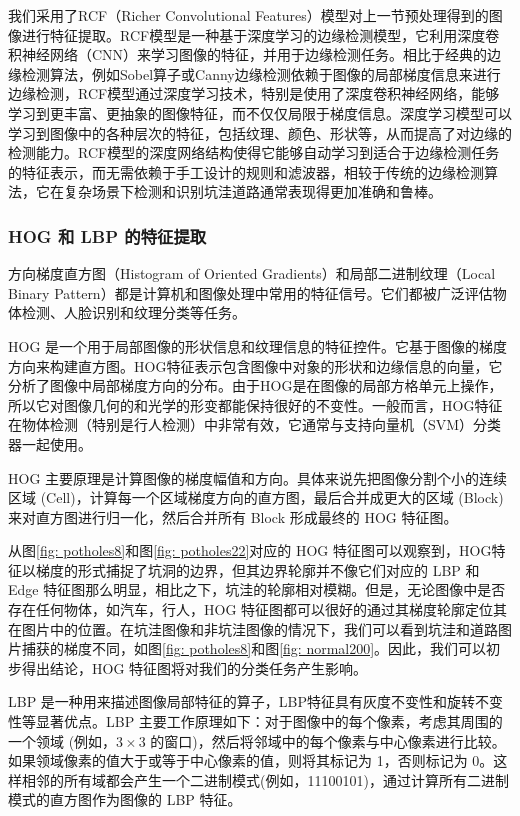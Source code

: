 \documentclass[a4paper, 10pt]{article}
\begin{document}
	我们采用了RCF（Richer Convolutional Features）模型对上一节预处理得到的图像进行特征提取。RCF模型是一种基于深度学习的边缘检测模型，它利用深度卷积神经网络（CNN）来学习图像的特征，并用于边缘检测任务。相比于经典的边缘检测算法，例如Sobel算子或Canny边缘检测依赖于图像的局部梯度信息来进行边缘检测，RCF模型通过深度学习技术，特别是使用了深度卷积神经网络，能够学习到更丰富、更抽象的图像特征，而不仅仅局限于梯度信息。深度学习模型可以学习到图像中的各种层次的特征，包括纹理、颜色、形状等，从而提高了对边缘的检测能力。RCF模型的深度网络结构使得它能够自动学习到适合于边缘检测任务的特征表示，而无需依赖于手工设计的规则和滤波器，相较于传统的边缘检测算法，它在复杂场景下检测和识别坑洼道路通常表现得更加准确和鲁棒。
	
	\subsubsection{HOG 和 LBP 的特征提取}
	
	方向梯度直方图（Histogram of Oriented Gradients）和局部二进制纹理（Local Binary Pattern）都是计算机和图像处理中常用的特征信号。它们都被广泛评估物体检测、人脸识别和纹理分类等任务。
	
	HOG 是一个用于局部图像的形状信息和纹理信息的特征控件。它基于图像的梯度方向来构建直方图。HOG特征表示包含图像中对象的形状和边缘信息的向量，它分析了图像中局部梯度方向的分布。由于HOG是在图像的局部方格单元上操作，所以它对图像几何的和光学的形变都能保持很好的不变性。一般而言，HOG特征在物体检测（特别是行人检测）中非常有效，它通常与支持向量机（SVM）分类器一起使用。
	
	HOG 主要原理是计算图像的梯度幅值和方向。具体来说先把图像分割个小的连续区域 (Cell)，计算每一个区域梯度方向的直方图，最后合并成更大的区域 (Block) 来对直方图进行归一化，然后合并所有 Block 形成最终的 HOG 特征图。
	
	从图\ref{fig: potholes8}和图\ref{fig: potholes22}对应的 HOG 特征图可以观察到，HOG特征以梯度的形式捕捉了坑洞的边界，但其边界轮廓并不像它们对应的 LBP 和 Edge 特征图那么明显，相比之下，坑洼的轮廓相对模糊。但是，无论图像中是否存在任何物体，如汽车，行人，HOG 特征图都可以很好的通过其梯度轮廓定位其在图片中的位置。在坑洼图像和非坑洼图像的情况下，我们可以看到坑洼和道路图片捕获的梯度不同，如图\ref{fig: potholes8}和图\ref{fig: normal200}。因此，我们可以初步得出结论，HOG 特征图将对我们的分类任务产生影响。
	
	
	LBP 是一种用来描述图像局部特征的算子，LBP特征具有灰度不变性和旋转不变性等显著优点。LBP 主要工作原理如下：对于图像中的每个像素，考虑其周围的一个领域 (例如，$3 \times 3$ 的窗口)，然后将邻域中的每个像素与中心像素进行比较。如果领域像素的值大于或等于中心像素的值，则将其标记为 1，否则标记为 0。这样相邻的所有域都会产生一个二进制模式(例如，11100101)，通过计算所有二进制模式的直方图作为图像的 LBP 特征。
	
\end{document}
